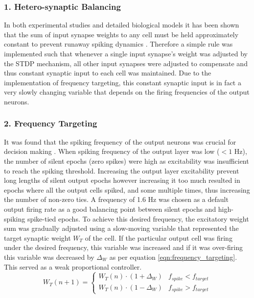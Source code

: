 \documentclass[11pt, twocolumn]{article}
\begin{document}
\subsubsection*{1. Hetero-synaptic Balancing}
In both experimental studies and detailed biological models it has been shown that the sum of input synapse weights to any cell must be held approximately constant to prevent runaway spiking dynamics \cite{sanda2017multi}. Therefore a simple rule was implemented such that whenever a single input synapse's weight was adjusted by the \acs{STDP} mechanism, all other input synapses were adjusted to compensate and thus constant synaptic input to each cell was maintained. Due to the implementation of frequency targeting, this constant synaptic input is in fact a very slowly changing variable that depends on the firing frequencies of the output neurons.

\subsubsection*{2. Frequency Targeting}
It was found that the spiking frequency of the output neurons was crucial for decision making \cite{sanda2017multi}. When spiking frequency of the output layer was low ($<1$ Hz), the number of silent epochs (zero spikes) were high as excitability was insufficient to reach the spiking threshold. Increasing the output layer excitability prevent long lengths of silent output epochs however increasing it too much resulted in epochs where all the output cells spiked, and some multiple times, thus increasing the number of non-zero ties. A frequency of 1.6 Hz was chosen as a default output firing rate as a good balancing point between silent epochs and high-spiking spike-tied epochs. To achieve this desired frequency, the excitatory weight sum was gradually adjusted using a slow-moving variable that represented the target synaptic weight $W_T$ of the cell. If the particular output cell was firing under the desired frequency, this variable was increased and if it was over-firing this variable was decreased by $\Delta_W$ as per equation \ref{eqn:frequency_targeting}. This served as a weak proportional controller.
\begin{equation}
	W_T(n+1) =
	\begin{cases} 
	W_T(n)\cdot(1+\Delta_W) & f_{spike} < f_{target} \\
	W_T(n)\cdot(1-\Delta_W) & f_{spike} > f_{target}
	\end{cases}
	\label{eqn:frequency_targeting}
\end{equation}
\end{document}
